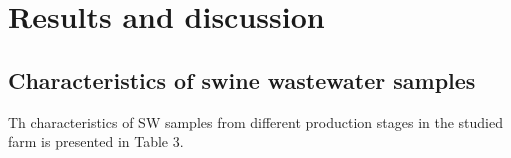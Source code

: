 \section{Results and discussion}
\subsection{Characteristics of swine wastewater samples}
Th characteristics of SW samples from different production stages in the studied farm is presented in Table 3. 